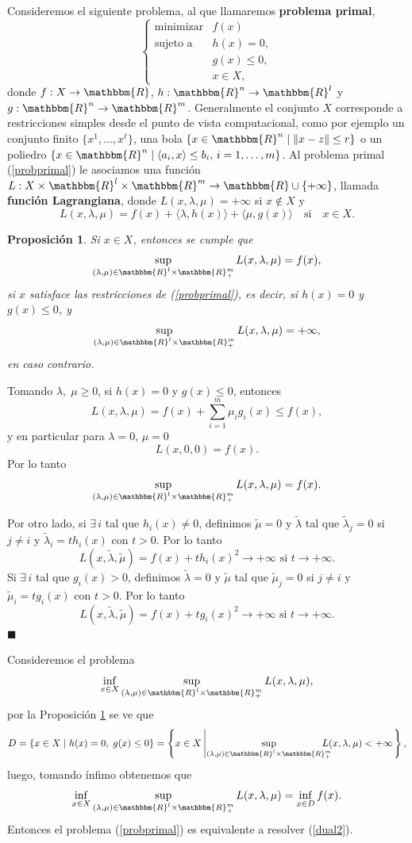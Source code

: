 \documentclass[a4paper,12pt]{report}
\newcommand{\la}{\langle}
\newcommand{\ra}{\rangle}
\newcommand{\RR}{\mathbbm{R}}
\newcommand{\Rn}{\RR^n}
\newcommand{\lam}{\lambda}
\newcommand{\arr}{\rightarrow}
\newcommand{\larr}{\longrightarrow}
\newtheorem{prop}[teo]{Proposici\'on}
\newenvironment{dem}{\vspace*{-0.1cm}{\it Demostraci\'on:}}{\hfill
$\blacksquare$\\}
\newcounter{ejemplo}
\begin{document}
Consideremos el siguiente problema, al que llamaremos {\bf problema primal},
\begin{equation}\label{probprimal}
\left\{
 \begin{array}{rl}
  \mathrm{minimizar}& f(x)\\
  \mbox{sujeto a}& h(x)=0,\\
& g(x)\leq 0,\\
&x\in X,
 \end{array}
\right.
\end{equation}
donde $f:X\arr\RR$, $h:\Rn\arr\RR^l$ y $g:\Rn\arr\RR^m$. Generalmente el conjunto $X$ corresponde a restricciones simples desde el punto de vista computacional, como por ejemplo un conjunto finito $\{x^1,\ldots,x^\ell\}$, una bola $\{x\in\Rn\mid \|x-z\|\leq r\}$ o un poliedro $\{x\in\Rn\mid \la a_i,x\ra \leq b_i,\, i=1,\ldots,m\}$.
Al problema primal (\ref{probprimal}) le asociamos una funci\'on $L:X\times\RR^l\times\RR^m\arr\RR\cup\{+\infty\}$, llamada {\bf funci\'on Lagrangiana}, donde $L(x,\lam,\mu)=+\infty$ si $x\notin X$ y 
$$L(x,\lam,\mu)=f(x)+\la\lam,h(x)\ra+\la\mu,g(x)\ra\quad\mbox{si}\quad x\in X.$$


\begin{prop}\label{dual1}
Si $x\in X$, entonces se cumple que 
$$\sup_{(\lam,\mu)\in\RR^l\times\RR^m_+}L(x,\lam,\mu)=f(x),$$
si $x$ satisface las restricciones de (\ref{probprimal}), es decir, si $h(x)=0$ y $g(x)\leq 0$, y $$\sup_{(\lam,\mu)\in\RR^l\times\RR^m_+}L(x,\lam,\mu)=+\infty,$$
en caso contrario.
\end{prop}
\begin{dem}
Tomando $\lam,\;\mu\geq 0$, si $h(x)=0$ y $g(x)\leq 0$, entonces
$$L(x,\lam,\mu)=f(x)+\sum_{i=1}^{m}\mu_{i}g_{i}(x)\leq f(x),$$
y en particular para $\lam=0$, $\mu=0$
$$L(x,0,0)=f(x).$$
Por lo tanto
$$\sup_{(\lam,\mu)\in\RR^l\times\RR^m_+}L(x,\lam,\mu)=f(x).$$

Por otro lado, si $\exists\,i$ tal que $h_{i}(x)\neq 0$, definimos $\tilde\mu=0$ y $\tilde\lam$ tal que $\tilde\lam_{j}=0$ si $j\neq i$ y $\tilde\lam_{i}=th_{i}(x)$ con $t>0$.
Por lo tanto
$$L(x,\tilde\lam,\tilde\mu)=f(x)+th_i(x)^2\larr+\infty\mbox{  si  }t\arr+\infty.$$
Si $\exists\,i$ tal que $g_i(x)>0$, definimos $\tilde\lam=0$ y $\tilde\mu$ tal que $\tilde\mu_j=0$ si $j\neq i$ y $\tilde\mu_{i}=tg_i(x)$ con $t>0$.
Por lo tanto
$$L(x,\tilde\lam,\tilde\mu)=f(x)+tg_i(x)^2\larr+\infty\mbox{  si  }t\arr+\infty.$$
\end{dem}


Consideremos el problema
\begin{equation}\label{dual2}
\inf_{x\in X}\sup_{(\lam,\mu)\in\RR^l\times\RR^m_+}L(x,\lam,\mu),
\end{equation}
por la Proposici\'on \ref{dual1} se ve que
$$D=\{x\in X\mid h(x)=0,\;g(x)\leq 0\}=
\left\{x\in X\left|\sup_{(\lam,\mu)\in\RR^l\times\RR^m_+}\hspace{-0.4cm}L(x,\lam,\mu)<+\infty\right.\right\},$$
luego, tomando \'infimo obtenemos que
$$
\inf_{x\in X}\sup_{(\lam,\mu)\in\RR^l\times\RR^m_+}L(x,\lam,\mu)=\inf_{x\in D}f(x).
$$
Entonces el problema (\ref{probprimal}) es equivalente a resolver (\ref{dual2}).
\end{document}
